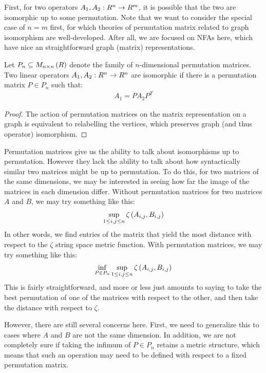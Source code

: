 First, for two operators
\(A_1, A_2 : R^n \to R^m\), it is possible that
the two are isomorphic up to some permutation.
Note that we want to consider the special case of \(n = m\) first,
for which theories of permutation matrix related to
graph isomorphism are well-developed.
After all, we are focused on NFAs here,
which have nice an straightforward graph (matrix) representations.

\begin{theorem}
  Let \(P_n \subseteq M_{n \times n}\left(R\right)\)
  denote the family of \(n\)-dimensional permutation matrices.
  Two linear operators
  \(A_1, A_2 : R^n \to R^n\) are isomorphic if
  there is a permutation matrix
  \(P \in P_n\) such that:
  \begin{align*}
    A_1 = P A_2 {P}^T
  \end{align*}
\end{theorem}
\begin{proof}
  The action of permutation matrices on the matrix representation on
  a graph is equivalent to relabelling the vertices,
  which preserves graph (and thus operator) isomorphism.
\end{proof}

Permutation matrices give us the ability to talk about
isomorphisms up to permutation.
However they lack the ability to talk about how
syntactically similar two matrices might be up to permutation.
To do this, for two matrices of the same dimensions,
we may be interested in seeing how far the image of the matrices
in each dimension differ.
Without permutation matrices
for two matrices \(A\) and \(B\), we may try something like this:
\begin{align*}
  \sup_{1 \leq i, j \leq n}
    \zeta\left(A_{i, j}, B_{i, j}\right)
\end{align*}
In other words, we find entries of the matrix that yield the most distance
with respect to the \(\zeta\) string space metric function.
With permutation matrices, we may try something like this:
\begin{align*}
  \inf_{P \in P_n} \sup_{1 \leq i, j \leq n}
    \zeta\left(A_{i, j}, B_{i, j}\right)
\end{align*}
This is fairly straightforward, and more or less just amounts to saying
to take the best permutation of one of the matrices with respect
to the other, and then take the distance with respect to
\(\zeta\).

However, there are still several concerns here.
First, we need to generalize this to cases where
\(A\) and \(B\) are not the same dimension.
In addition, we are not completely sure if taking the infimum of
\(P \in P_n\) retains a metric structure,
which means that such an operation may need to be defined with respect
to a fixed permutation matrix.


